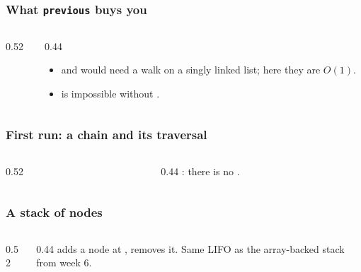 \documentclass[aspectratio=169,10pt,compress]{beamer}
\begin{document}
\begin{frame}[t,fragile]\frametitle{What \texttt{previous} buys you}
  \begin{columns}[T]
    \begin{column}{0.52\textwidth}
    \end{column}
    \begin{column}{0.44\textwidth}
      \small
      \begin{itemize}
        \item {} and  would need a walk
              on a singly linked list; here they are $O(1)$.
        \item {} is impossible without
              .
      \end{itemize}
    \end{column}
  \end{columns}
\end{frame}

\begin{frame}[t,fragile]\frametitle{First run: a chain and its traversal}
  \begin{columns}[T]
    \begin{column}{0.52\textwidth}
    \end{column}
    \begin{column}{0.44\textwidth}
      \small
      : there is no .
    \end{column}
  \end{columns}
\end{frame}

\begin{frame}[t,fragile]\frametitle{A stack of nodes}
  \begin{columns}[T]
    \begin{column}{0.52\textwidth}
    \end{column}
    \begin{column}{0.44\textwidth}
      \small
       adds a node at ,  removes it.
      Same LIFO as the array-backed stack from week 6.
    \end{column}
  \end{columns}
\end{frame}
\end{document}
